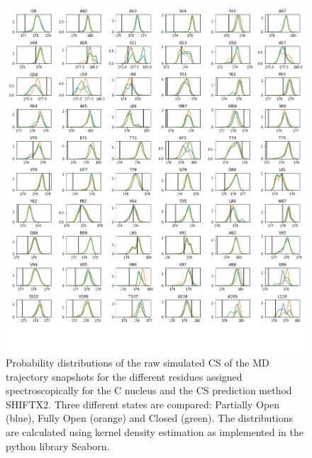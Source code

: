 \documentclass[%
 aip,
 amsmath,amssymb,
 preprint,%
]{revtex4-1}
\begin{document}
\begin{figure}[tbp]
	\includegraphics[width=\textwidth]{figures_SI/hist_sparta_plus_C.png}
	 \caption{\scriptsize
 Probability distributions of the raw simulated CS of the MD trajectory snapshots for the different residues assigned spectroscopically for the C nucleus and the CS prediction method SHIFTX2. Three different states are compared: Partially Open (blue), Fully Open (orange) and Closed (green). The distributions are calculated using kernel density estimation as implemented in the python library Seaborn. 
}
\label{SI_hist7}
\end{figure}
\end{document}
